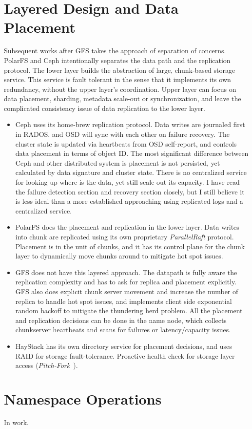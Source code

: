 \section{Layered Design and Data Placement}
Subsequent works after GFS takes the approach of separation of concerns.
PolarFS and Ceph intentionally separates the data path and the replication
protocol. The lower layer builds the abstraction of large, chunk-based storage
service. This service is fault tolerant in the sense that it implements its own
redundancy, without the upper layer's coordination.  Upper layer can focus on
data placement, sharding, metadata scale-out or synchronization, and leave the
complicated consistency issue of data replication to the lower layer.

\begin{itemize}
    \item Ceph uses its home-brew replication protocol. Data writes are
        journaled first in RADOS, and OSD will sync with each other on failure
        recovery. The cluster state is updated via heartbeats from OSD
        self-report, and controls data placement in terms of object ID. The
        most significant difference between Ceph and other distributed system
        is placement is not persisted, yet calculated by data signature and
        cluster state. There is no centralized service for looking up where is
        the data, yet still scale-out its capacity. I have read the failure
        detection section and recovery section closely, but I still believe it
        is less ideal than a more established approaching using replicated logs
        and a centralized service.

    \item PolarFS does the placement and replication in the lower layer. Data
        writes into chunk are replicated using its own proprietary
        \textit{ParallelRaft} protocol. Placement is in the unit of chunks, and
        it has its control plane for the chunk layer to dynamically move chunks
        around to mitigate hot spot issues.

    \item GFS does not have this layered approach. The datapath is fully aware
        the replication complexity and has to ask for replica and placement
        explicitly. GFS also does explicit chunk server movement and increase
        the number of replica to handle hot spot issues, and implements client
        side exponential random backoff to mitigate the thundering herd
        problem. All the placement and replication decisions can be done in the
        name node, which collects chunkserver heartbeats and scans for failures
        or latency/capacity issues.

    \item HayStack has its own directory service for placement decisions, and
        uses RAID for storage fault-tolerance. Proactive health check for
        storage layer access (\textit{Pitch-Fork}~\cite{beaver2010finding}).
\end{itemize}

\section{Namespace Operations}
In work.

{}


